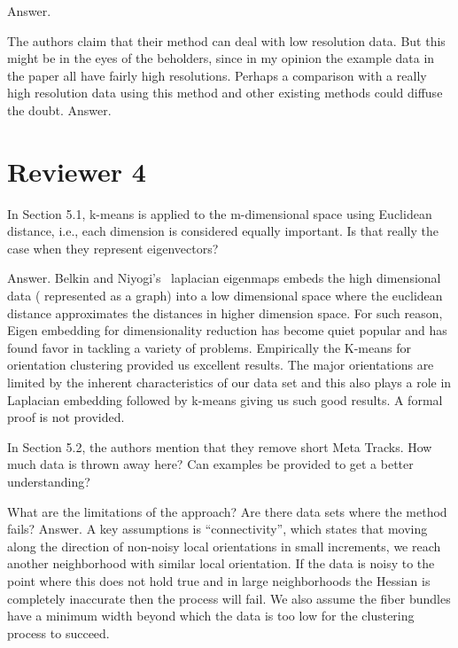 \documentclass[]{article}
\begin{document}
\color{black}
Answer.


\color{red}
The authors claim that their method can deal with low resolution data.
But this might be in the eyes of the beholders, since in my opinion the example data in the paper all have fairly high resolutions. Perhaps a comparison with a really high resolution data using this method and other existing methods could diffuse the doubt.
\color{black}
Answer.

\section{Reviewer 4}
\color{red}
In Section 5.1, k-means is applied to the m-dimensional space using
Euclidean distance, i.e., each dimension is considered equally important.
Is that really the case when they represent eigenvectors?

\color{black}
Answer. Belkin  and Niyogi's~\cite{Belkin01} laplacian eigenmaps embeds the high dimensional data ( represented as a graph) into a low dimensional space where the euclidean distance approximates the distances in higher dimension space. For such reason, Eigen embedding for dimensionality reduction has become quiet popular and has found favor in tackling a variety of problems. Empirically the K-means for orientation clustering provided us excellent results. The major orientations are limited by the inherent characteristics of our data set and this also plays a role in Laplacian embedding followed by k-means giving us such good results. A formal proof is not provided. 

\color{red}
In Section 5.2, the authors mention that they remove short Meta Tracks.
How much data is thrown away here? Can examples be provided to get a
better understanding?
\color{black}


\color{red}

What are the limitations of the approach? Are there data sets where the
method fails?
\color{black}
Answer. A key assumptions is ``connectivity'', which states that moving along the direction of non-noisy local orientations in small increments, we reach another neighborhood with similar local orientation.
If the data is noisy to the point where this does not hold true and in large neighborhoods the Hessian is completely inaccurate then the process will fail.
We also assume the fiber bundles have a minimum width beyond which the data is too low for the clustering process to succeed. 


   


\end{document}

